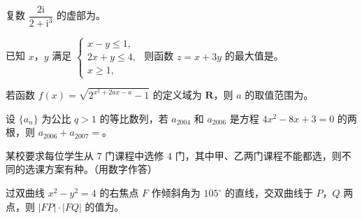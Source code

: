\begin{question}
复数 $\dfrac{2\mathrm i}{2+\mathrm i^3}$ 的虚部为\gkblank{}。

\end{question}
\begin{question}
已知 $x$，$y$ 满足 $\begin{cases}x-y\leqslant1,\\ 2x+y\leqslant4,\\ x\geqslant1,\end{cases}$ 则函数 $z=x+3y$ 的最大值是\gkblank{}。

\end{question}
\begin{question}
若函数 $f(x)=\sqrt{2^{x^2+2ax-a}-1}$ 的定义域为 $\mathbf R$，则 $a$ 的取值范围为\gkblank{}。

\end{question}
\begin{question}
设 $\{a_n\}$ 为公比 $q>1$ 的等比数列，若 $a_{2004}$ 和 $a_{2006}$ 是方程 $4x^2-8x+3=0$ 的两根，则 $a_{2006}+a_{2007}=$\gkblank{}。

\end{question}
\begin{question}
某校要求每位学生从 $7$ 门课程中选修 $4$ 门，其中甲、乙两门课程不能都选，则不同的选课方案有\gkblank{}种。（用数字作答）

\end{question}
\begin{question}
过双曲线 $x^2-y^2=4$ 的右焦点 $F$ 作倾斜角为 $105^\circ$ 的直线，交双曲线于 $P$，$Q$ 两点，则 $|FP|\cdot|FQ|$ 的值为\gkblank{}。

\end{question}

